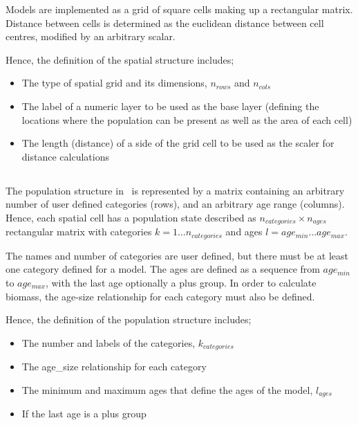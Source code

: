 Models are implemented as a grid of square cells making up a rectangular matrix. Distance between cells is determined as the euclidean distance between cell centres, modified by an arbitrary scalar. 

Hence, the definition of the spatial structure includes;
\begin{itemize}
\item The type of spatial grid and its dimensions, $n_{rows}$ and $n_{cols}$
\item The label of a numeric layer to be used as the base layer (defining the locations where the population can be present as well as the area of each cell)
\item The length (distance) of a side of the grid cell to be used as the scaler for distance calculations
\end{itemize}

\subsection{}

The population structure in \SPM\ is represented by a matrix containing an arbitrary number of user defined categories (rows), and an arbitrary age range (columns). Hence, each spatial cell has a population state described as $n_{categories} \times n_{ages}$ rectangular matrix with categories $k=1 \ldots n_{categories}$ and ages $l=age_{min} \ldots age_{max}$. 

The names and number of categories are user defined, but there must be at least one category defined for a model. The ages are defined as a sequence from $age_{min}$ to $age_{max}$, with the last age optionally a plus group. In order to calculate biomass, the age-size relationship for each category must also be defined.

Hence, the definition of the population structure includes;
\begin{itemize}
  \item The number and labels of the categories, $k_{categories}$
	\item The age\_size relationship for each category
  \item The minimum and maximum ages that define the ages of the model, $l_{ages}$
  \item If the last age is a plus group
\end{itemize}

\subsection{\label{sec:layers}}

